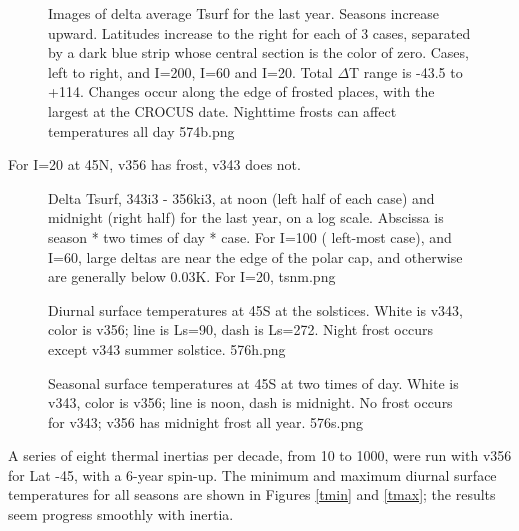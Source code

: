 \documentclass{article}
\begin{document}
\begin{figure}[!ht] 
\caption[Image of delta average Tsurf]{Images of delta average Tsurf for the
    last year. Seasons increase upward. Latitudes increase to the right for each
    of 3 cases, separated by a dark blue strip whose central section is the
    color of zero. Cases, left to right, and I=200, I=60 and I=20. Total
    $\Delta$T range is -43.5 to +114. Changes occur along the edge of frosted
    places, with the largest at the CROCUS date. Nighttime frosts can affect
    temperatures all day
\label{574b}  574b.png }
\end{figure} 

 For I=20 at 45N, v356 has frost, v343 does not.
 
\begin{figure}[!ht] 
\caption[Temperature differences at noon and midnight]{Delta Tsurf, 343i3 -
  356ki3, at noon (left half of each case) and midnight (right half) for the
  last year, on a log scale. Abscissa is season * two times of day * case. For
  I=100 ( left-most case), and I=60, large deltas are near the edge of the polar
  cap, and otherwise are generally below 0.03K. For I=20,
\label{tsnm}  tsnm.png }
\end{figure} 

\begin{figure}[!ht] 
\caption[Diurnal temperatures at 45S]{Diurnal surface temperatures at 45S at the
  solstices. White is v343, color is v356; line is Ls=90, dash is Ls=272. Night
  frost occurs except v343 summer solstice.
\label{576h}  576h.png }
\end{figure} 

\begin{figure}[!ht] 
\caption[Seasonal temperatures at 45S]{Seasonal surface temperatures at 45S at
  two times of day. White is v343, color is v356; line is noon, dash is
  midnight. No frost occurs for v343; v356 has midnight frost all year.
\label{576s}  576s.png }
\end{figure} 

A series of eight thermal inertias per decade, from 10 to 1000, were run with
v356 for Lat -45\qd, with a 6-year spin-up. The minimum and maximum diurnal
surface temperatures for all seasons are shown in Figures \ref{tmin} and
\ref{tmax}; the results seem progress smoothly with inertia.
\end{document}
